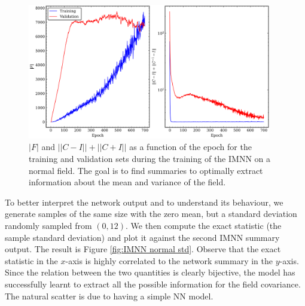 \begin{figure}
    \centering
    \includegraphics[width=0.95\textwidth]{img/ML/normal_plot_training.png}
    \caption{$|F|$ and $||C-I ||+||C+I||$ as a function of the epoch for the training and validation sets during the training of the IMNN on a normal field. The goal is to find summaries to optimally extract information about the mean and variance of the field.}
    \label{fig:IMNN training normal test}
\end{figure}

To better interpret the network output and to understand its behaviour, we generate samples of the same size with the zero mean, but a standard deviation randomly sampled from $(0,12)$. We then compute the exact statistic (the sample standard deviation) and plot it against the second IMNN summary output. The result is Figure \ref{fig:IMNN normal std}. Observe that the exact statistic in the $x$-axis is highly correlated to the network summary in the $y$-axis. Since the relation between the two quantities is clearly bijective, the model has successfully learnt to extract all the possible information for the field covariance. The natural scatter is due to having a simple NN model.

